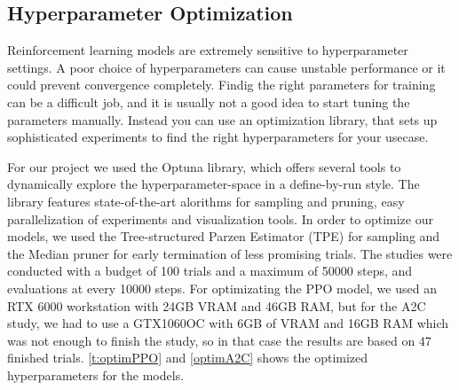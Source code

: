 \documentclass{article}
\begin{document}
\subsection{\normalsize{Hyperparameter Optimization}}
Reinforcement learning models are extremely sensitive to hyperparameter settings. A poor choice of hyperparameters can cause unstable performance or it could prevent convergence completely. Findig the right parameters for training can be a difficult job, and it is usually not a good idea to start tuning the parameters manually. Instead you can use an optimization library, that sets up sophisticated experiments to find the right hyperparameters for your usecase.

For our project we used the Optuna library, which offers several tools to dynamically explore the hyperparameter-space in a define-by-run style. The library features state-of-the-art alorithms for sampling and pruning, easy parallelization of experiments and visualization tools. In order to optimize our models, we used the Tree-structured Parzen Estimator (TPE) for sampling and the Median pruner for early termination of less promising trials. The studies were conducted with a budget of 100 trials and a maximum of 50000 steps, and evaluations at every 10000 steps. For optimizating the PPO model, we used an RTX 6000 workstation with 24GB VRAM and 46GB RAM, but for the A2C study, we had to use a GTX1060OC with 6GB of VRAM and 16GB RAM which was not enough to finish the study, so in that case the results are based on 47 finished trials. \ref{t:optimPPO} and \ref{optimA2C} shows the optimized hyperparameters for the models.
\end{document}
